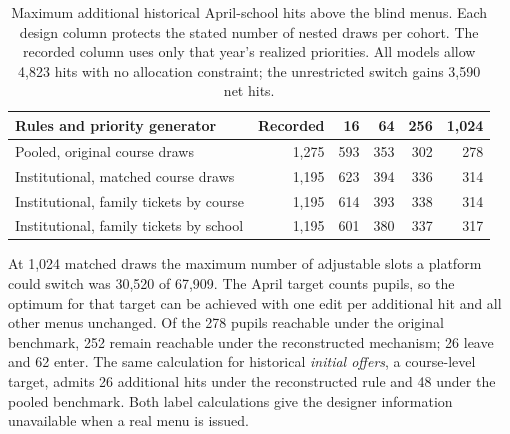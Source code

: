 \begin{table}[ht]\centering\small
\caption{Maximum additional historical April-school hits above the blind menus. Each design column protects the stated number of nested draws per cohort. The recorded column uses only that year's realized priorities. All models allow 4,823 hits with no allocation constraint; the unrestricted switch gains 3,590 net hits.}\label{tab:inst-ceilings}
\begin{tabular}{@{}lrrrrr@{}}\toprule
Rules and priority generator & Recorded & 16 & 64 & 256 & 1,024\\\midrule
Pooled, original course draws & 1,275 & 593 & 353 & 302 & 278\\
Institutional, matched course draws & 1,195 & 623 & 394 & 336 & 314\\
Institutional, family tickets by course & 1,195 & 614 & 393 & 338 & 314\\
Institutional, family tickets by school & 1,195 & 601 & 380 & 337 & 317\\\bottomrule
\end{tabular}
\end{table}

At 1,024 matched draws the maximum number of adjustable slots a platform could switch was 30,520 of 67,909. The April target counts pupils, so the optimum for that target can be achieved with one edit per additional hit and all other menus unchanged. Of the 278 pupils reachable under the original benchmark, 252 remain reachable under the reconstructed mechanism; 26 leave and 62 enter. The same calculation for historical \emph{initial offers}, a course-level target, admits 26 additional hits under the reconstructed rule and 48 under the pooled benchmark. Both label calculations give the designer information unavailable when a real menu is issued.

